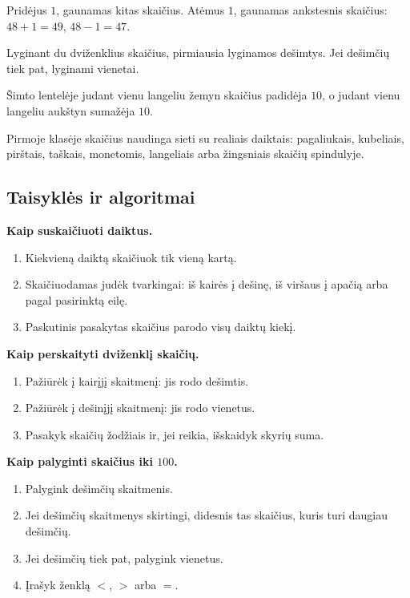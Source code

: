 \begin{savybe}
Pridėjus \(1\), gaunamas kitas skaičius. Atėmus \(1\), gaunamas ankstesnis skaičius: \(48+1=49\), \(48-1=47\).
\end{savybe}

\begin{savybe}
Lyginant du dviženklius skaičius, pirmiausia lyginamos dešimtys. Jei dešimčių tiek pat, lyginami vienetai.
\end{savybe}

\begin{savybe}
Šimto lentelėje judant vienu langeliu žemyn skaičius padidėja \(10\), o judant vienu langeliu aukštyn sumažėja \(10\).
\end{savybe}

\begin{pastaba}
Pirmoje klasėje skaičius naudinga sieti su realiais daiktais: pagaliukais, kubeliais, pirštais, taškais, monetomis, langeliais arba žingsniais skaičių spindulyje.
\end{pastaba}

\subsection{Taisyklės ir algoritmai}

\textbf{Kaip suskaičiuoti daiktus.}
\begin{enumerate}
\item Kiekvieną daiktą skaičiuok tik vieną kartą.
\item Skaičiuodamas judėk tvarkingai: iš kairės į dešinę, iš viršaus į apačią arba pagal pasirinktą eilę.
\item Paskutinis pasakytas skaičius parodo visų daiktų kiekį.
\end{enumerate}

\textbf{Kaip perskaityti dviženklį skaičių.}
\begin{enumerate}
\item Pažiūrėk į kairįjį skaitmenį: jis rodo dešimtis.
\item Pažiūrėk į dešinįjį skaitmenį: jis rodo vienetus.
\item Pasakyk skaičių žodžiais ir, jei reikia, išskaidyk skyrių suma.
\end{enumerate}

\textbf{Kaip palyginti skaičius iki \(100\).}
\begin{enumerate}
\item Palygink dešimčių skaitmenis.
\item Jei dešimčių skaitmenys skirtingi, didesnis tas skaičius, kuris turi daugiau dešimčių.
\item Jei dešimčių tiek pat, palygink vienetus.
\item Įrašyk ženklą \(<\), \(>\) arba \(=\).
\end{enumerate}

